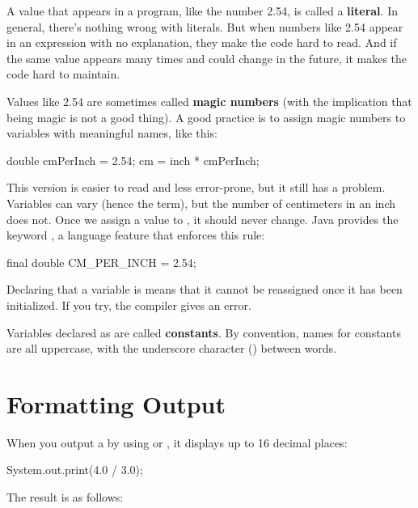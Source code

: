 
A value that appears in a program, like the number 2.54, is called a {\bf literal}.
In general, there's nothing wrong with literals.
But when numbers like 2.54 appear in an expression with no explanation, they make the code hard to read.
And if the same value appears many times and could change in the future, it makes the code hard to maintain.


Values like 2.54 are sometimes called {\bf magic numbers} (with the implication that being magic is not a good thing).
A good practice is to assign magic numbers to variables with meaningful names, like this:

\begin{code}
double cmPerInch = 2.54;
cm = inch * cmPerInch;
\end{code}

This version is easier to read and less error-prone, but it still has a problem.
Variables can vary (hence the term), but the number of centimeters in an inch does not.
Once we assign a value to , it should never change.
Java provides the keyword , a language feature that enforces this rule:

\begin{code}
final double CM_PER_INCH = 2.54;
\end{code}


Declaring that a variable is  means that it cannot be reassigned once it has been initialized.
If you try, the compiler gives an error.

Variables declared as  are called {\bf constants}.
By convention, names for constants are all uppercase, with the underscore character (\java{_}) between words.


\section{Formatting Output}
\label{printf}

When you output a  by using  or , it displays up to 16 decimal places:

\begin{code}
System.out.print(4.0 / 3.0);
\end{code}

The result is as follows:

